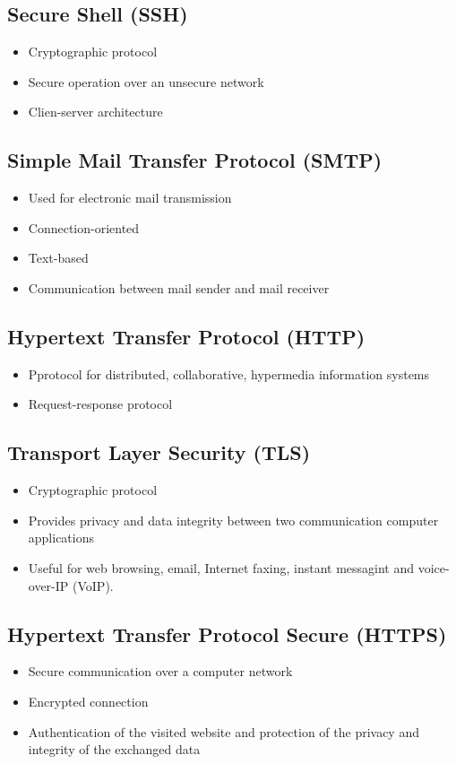 \subsection{Secure Shell (SSH)} 
\begin{itemize}
\item Cryptographic protocol
\item Secure operation over an unsecure network
\item Clien-server architecture
\end{itemize}
\subsection{Simple Mail Transfer Protocol (SMTP)} 
\begin{itemize}
\item Used for electronic mail transmission
\item Connection-oriented
\item Text-based
\item Communication between mail sender and mail receiver
\end{itemize}
\subsection{Hypertext Transfer Protocol (HTTP)} 
\begin{itemize}
\item Pprotocol for distributed, collaborative, hypermedia information systems
\item Request-response protocol
\end{itemize}
\subsection{Transport Layer Security (TLS)} 
\begin{itemize}
\item Cryptographic protocol
\item Provides privacy and data integrity between two communication computer applications
\item Useful for web browsing, email, Internet faxing, instant messagint and voice-over-IP (VoIP).
\end{itemize}
\subsection{Hypertext Transfer Protocol Secure (HTTPS)}
\begin{itemize}
\item Secure communication over a computer network
\item Encrypted connection
\item Authentication of the visited website and protection of the privacy and integrity of the exchanged data
\end{itemize}
